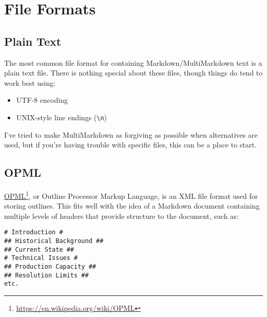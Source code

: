 
\def\mytitle{MultiMarkdown File Formats}
\def\myauthor{Fletcher T. Penney}
\def\revised{2018-10-10}




\tableofcontents

\chapter{File Formats}
\label{fileformats}

\section{Plain Text}
\label{plaintext}

The most common file format for containing Markdown\slash{}MultiMarkdown text is a plain text file. There is nothing special about these files, though things do tend to work best using:

\begin{itemize}
\item UTF-8 encoding

\item UNIX-style line endings (\texttt{\textbackslash{}n})

\end{itemize}

I've tried to make MultiMarkdown as forgiving as possible when alternatives are used, but if you're having trouble with specific files, this can be a place to start.

\section{OPML}
\label{opml}

\href{https://en.wikipedia.org/wiki/OPML}{OPML}\footnote{\href{https://en.wikipedia.org/wiki/OPML}{https:\slash{}\slash{}en.wikipedia.org\slash{}wiki\slash{}OPML}}, or Outline Processor Markup Language, is an XML file format used for storing outlines. This fits well with the idea of a Markdown document containing multiple levels of headers that provide structure to the document, such as:

\begin{verbatim}
# Introduction #
## Historical Background ##
## Current State ##
# Technical Issues #
## Production Capacity ##
## Resolution Limits ##
etc.
\end{verbatim}

